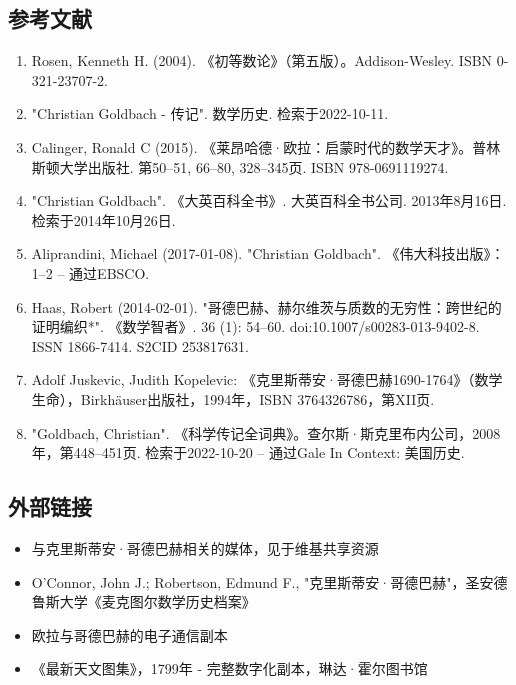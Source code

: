 \subsection{参考文献} 
\begin{enumerate}
\item Rosen, Kenneth H. (2004). 《初等数论》（第五版）。Addison-Wesley. ISBN 0-321-23707-2.  
\item "Christian Goldbach - 传记". 数学历史. 检索于2022-10-11.  
\item Calinger, Ronald C (2015). 《莱昂哈德·欧拉：启蒙时代的数学天才》。普林斯顿大学出版社. 第50–51, 66–80, 328–345页. ISBN 978-0691119274.  
\item "Christian Goldbach". 《大英百科全书》. 大英百科全书公司. 2013年8月16日. 检索于2014年10月26日.  
\item Aliprandini, Michael (2017-01-08). "Christian Goldbach". 《伟大科技出版》：1–2 – 通过EBSCO.  
\item Haas, Robert (2014-02-01). "哥德巴赫、赫尔维茨与质数的无穷性：跨世纪的证明编织*". 《数学智者》. 36 (1): 54–60. doi:10.1007/s00283-013-9402-8. ISSN 1866-7414. S2CID 253817631.  
\item Adolf Juskevic, Judith Kopelevic: 《克里斯蒂安·哥德巴赫1690-1764》（数学生命），Birkhäuser出版社，1994年，ISBN 3764326786，第XII页.  
\item "Goldbach, Christian". 《科学传记全词典》。查尔斯·斯克里布内公司，2008年，第448–451页. 检索于2022-10-20 – 通过Gale In Context: 美国历史.
\end{enumerate}
\subsection{外部链接} 
\begin{itemize}
\item 与克里斯蒂安·哥德巴赫相关的媒体，见于维基共享资源  
\item O'Connor, John J.; Robertson, Edmund F., "克里斯蒂安·哥德巴赫"，圣安德鲁斯大学《麦克图尔数学历史档案》  
\item 欧拉与哥德巴赫的电子通信副本  
\item 《最新天文图集》，1799年 - 完整数字化副本，琳达·霍尔图书馆
\end{itemize}